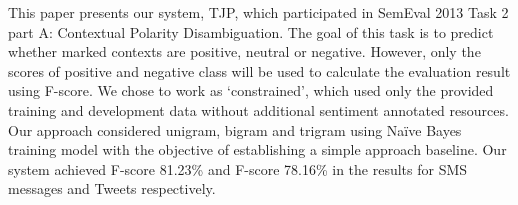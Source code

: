 This paper presents our system, TJP, which participated in SemEval 2013 Task 2 part A: Contextual Polarity Disambiguation. The goal of this task is to predict
 whether marked contexts are positive, neutral or negative. However, only the
 scores of positive and negative class will be used to calculate the evaluation
 result using F-score. We chose to work as ‘constrained', which used only
 the provided training and development data without additional sentiment
 annotated resources. Our approach considered unigram, bigram and trigram using
 Naïve Bayes training model with the objective of establishing a
 simple approach baseline. Our system achieved F-score 81.23\% and F-score 78.16\%
 in the results for SMS messages and Tweets respectively.

